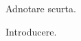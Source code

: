 \documentclass[a4paper,12pt]{report}
\begin{document}
Adnotare scurta.
\clearpage

\introChapter
Introducere.
\end{document}
